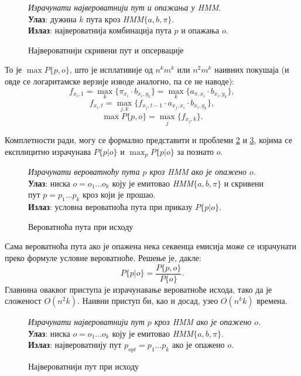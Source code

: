 \documentclass[12pt,oneside]{memoir}
\newenvironment{problem}[1][!ht]
{\renewcommand{\algorithmcfname}{Проблем}
\begin{figure}[!ht]
\centering
  \begin{minipage}{.94\linewidth}
	\begin{algorithm}[#1]%
  }{\end{algorithm}
  \end{minipage}
\end{figure}}
\begin{document}
\begin{CJK}{UTF8}{ipxm}
\begin{problem}[H]
  \SetAlgoLined
  \textit{Израчунати највероватнији пут и опажања у \textit{HMM}.}\\
  \textbf{Улаз}: дужина $k$ пута кроз \textit{HMM}$\{a, b, \pi\}$.\\
  \textbf{Излаз}: највероватнија комбинација пута $p$ и опажања $o$.
  \caption{Највероватнији скривени пут и опсервације}
  \label{prob:maxpo}
\end{problem}

То је $\max P\{p, o\}$, што је исплативије од $n^k m^k$ или $n^2 m^k$ наивних покушаја (и овде се логаритамске верзије изводе аналогно, па се не наводе): $$f_{x_i, 1} = \max_k \{\pi_{x_i} \cdot b_{x_i, y_k}\} = \max_k \{a_{\pi, x_i} \cdot b_{x_i, y_k}\},$$ $$f_{x_i, t} = \max_{j, k} \{f_{x_j, t-1} \cdot a_{x_j, x_i} \cdot b_{x_i, y_k}\},$$ $$\max P\{p, o\} = \max_j \{f_{x_j, k}\}.$$

Комплетности ради, могу се формално представити и проблеми \ref{prob:putpri} и \ref{prob:maxputpri}, којима се експлицитно израчунава $P\{p | o\}$ и $\max_p P\{p | o\}$ за познато $o$.

\begin{problem}[H]
  \SetAlgoLined
  \textit{Израчунати вероватноћу пута $p$ кроз \textit{HMM} ако је опажено $o$.}\\
  \textbf{Улаз}: ниска $o = o_1...o_k$ коју је емитовао \textit{HMM}$\{a, b, \pi\}$ и скривени пут $p = p_1...p_k$ кроз који је прошао.\\
  \textbf{Излаз}: условна вероватноћа пута при приказу $P\{p | o\}$.
  \caption{Вероватноћа пута при исходу}
  \label{prob:putpri}
\end{problem}

Сама вероватноћа пута ако је опажена нека секвенца емисија може се израчунати преко формуле условне вероватноће. Решење је, дакле: $$P\{p | o\} = \frac{P\{p, o\}}{P\{o\}}.$$ Главнина оваквог приступа је израчунавање вероватноће исхода, тако да је сложеност $O(n^2 k)$. Наивни приступ би, као и досад, узео $O(n^k k)$ времена.

\begin{problem}[H]
  \SetAlgoLined
  \textit{Израчунати највероватнији пут $p$ кроз \textit{HMM} ако је опажено $o$.}\\
  \textbf{Улаз}: ниска $o = o_1...o_k$ коју је емитовао \textit{HMM}$\{a, b, \pi\}$.\\
  \textbf{Излаз}: највероватнију пут $p_{opt} = p_1...p_k$ ако је опажено $o$.
  \caption{Највероватнији пут при исходу}
  \label{prob:maxputpri}
\end{problem}


\end{CJK}
\end{document}

